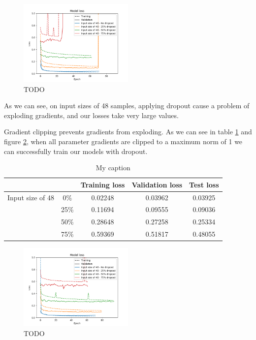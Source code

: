 \documentclass[]{article}
\begin{document}
\begin{figure}[H]
	\centering
	\includegraphics[width=0.5\textwidth]{drop12}
	\caption{TODO}
	\label{f:drop12}
\end{figure}

As we can see, on input sizes of 48 samples, applying dropout cause a problem of exploding gradients, and our losses take very large values.

Gradient clipping prevents gradients from exploding. As we can see in table \ref{t:drop2} and figure \ref{f:drop2}, when all parameter gradients are clipped to a maximum norm of 1 we can successfully train our models with dropout.

\begin{table}[H]
	\centering
	\begin{tabular}{@{}ccccc@{}}
		\toprule
		&      & Training loss & Validation loss & Test loss \\ \midrule
		Input size of 48 & 0\%  & 0.02248       & 0.03962         & 0.03925   \\
		& 25\% & 0.11694       & 0.09555         & 0.09036   \\
		& 50\% & 0.28648       & 0.27258         & 0.25334   \\
		& 75\% & 0.59369       & 0.51817         & 0.48055   \\ \bottomrule
	\end{tabular}
	\caption{My caption}
	\label{t:drop2}
\end{table}

\begin{figure}[H]
	\centering
	\includegraphics[width=0.5\textwidth]{drop2}
	\caption{TODO}
	\label{f:drop2}
\end{figure}
\end{document}
